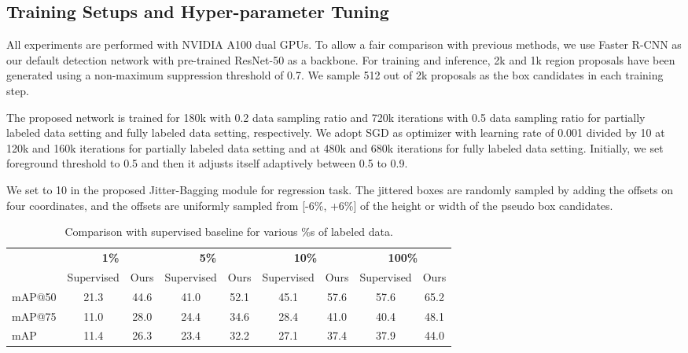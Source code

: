 \documentclass[10pt,twocolumn,letterpaper]{article}
\begin{document}
\subsection{Training Setups and Hyper-parameter Tuning}
All experiments are performed with NVIDIA A100 dual GPUs. To allow a fair comparison with previous methods, we use Faster R-CNN \cite{ren2015faster} as our default detection network with pre-trained ResNet-50 \cite{he2016deep} as a backbone. For training and inference, 2k and 1k region proposals have been generated using a non-maximum suppression threshold of 0.7. We sample 512 out of 2k proposals as the box candidates in each training step.

The proposed network is trained for 180k with 0.2 data sampling ratio and 720k iterations with 0.5 data sampling ratio for partially labeled data setting and fully labeled data setting, respectively. 
We adopt SGD as optimizer with learning rate of 0.001 divided by 10 at 120k and 160k iterations for partially labeled data setting and at 480k and 680k iterations for fully labeled data setting. Initially, we set foreground threshold to 0.5 and then it adjusts itself adaptively between 0.5 to 0.9. 


We set  to 10 in the proposed Jitter-Bagging module for regression task. The jittered boxes are randomly sampled by adding the offsets on four coordinates, and the offsets are uniformly sampled from [-6\%, +6\%] of the height or width of the pseudo box candidates.







\begin{table}[t!]
\centering
\caption{Comparison with supervised baseline for various \%s of labeled data.} \label{tab:proposed-supervised}
\vspace{-0.5em}
\begin{adjustbox}{width=.47\textwidth,center}
\begin{tabular}{l|cc|cc|cc|cc}
\hline
       & \multicolumn{2}{c|}{\textbf{1\%}} & \multicolumn{2}{c|}{\textbf{5\%}} & \multicolumn{2}{c|}{\textbf{10\%}} & \multicolumn{2}{c}{\textbf{100\%}} \\ \cline{2-9}
       & Supervised  &  Ours    & Supervised    & Ours   & Supervised     & Ours  & Supervised     & Ours    \\ \hline
mAP@50 & 21.3          & 44.6    & 41.0          & 52.1    & 45.1           & 57.6    & 57.6           & 65.2     \\
mAP@75 & 11.0          & 28.0    & 24.4          & 34.6    & 28.4           & 41.0    & 40.4           & 48.1 \\    
mAP & 11.4          & 26.3    & 23.4          & 32.2    & 27.1           & 37.4    & 37.9           & 44.0     \\  \hline
\end{tabular}
\end{adjustbox}
\end{table}
\end{document}
